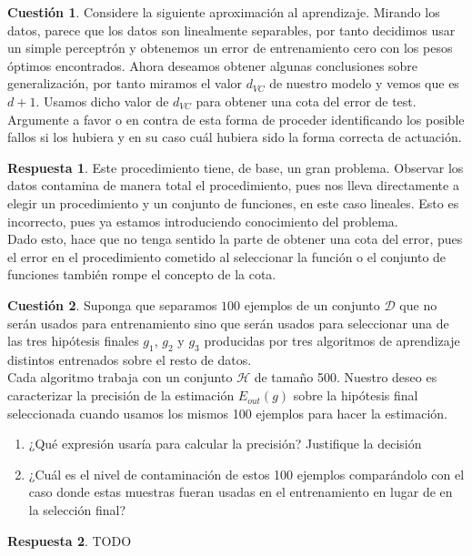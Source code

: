 \documentclass[10pt,a4paper]{article}
\theoremstyle{definition}
\newtheorem{cuestion}{Cuestión}
\newtheorem*{respuesta}{Respuesta}
\begin{document}
\begin{cuestion}
Considere la siguiente aproximación al aprendizaje. Mirando los datos, parece que los datos son linealmente separables, por tanto decidimos usar un simple perceptrón y obtenemos un error de entrenamiento cero con los pesos óptimos encontrados. Ahora deseamos obtener algunas conclusiones sobre generalización, por tanto miramos el valor $d_{VC}$ de nuestro modelo y vemos que es $d + 1$. Usamos dicho valor de $d_{VC}$ para obtener una cota del error de test. Argumente a favor o en contra de esta forma de proceder identificando los posible fallos si los hubiera y en su caso cuál hubiera sido la forma correcta de actuación.\\

\end{cuestion}
\begin{respuesta}
Este procedimiento tiene, de base, un gran problema. Observar los datos contamina de manera total el procedimiento, pues nos lleva directamente a elegir un procedimiento y un conjunto de funciones, en este caso lineales. Esto es incorrecto, pues ya estamos introduciendo conocimiento del problema.\\

Dado esto, hace que no tenga sentido la parte de obtener una cota del error, pues el error en el procedimiento cometido al seleccionar la función o el conjunto de funciones también rompe el concepto de la cota.\\
 
\end{respuesta}

\begin{cuestion}
Suponga que separamos $100$ ejemplos de un conjunto $\mathcal{D}$ que no serán usados para entrenamiento sino que serán usados para seleccionar una de las tres hipótesis finales $g_1$, $g_2$ y $g_3$ producidas por tres algoritmos de aprendizaje distintos entrenados sobre el resto de datos.\\
Cada algoritmo trabaja con un conjunto $\mathcal{H}$ de tamaño 500. Nuestro deseo es caracterizar la precisión de la estimación $E_{out}(g)$ sobre la hipótesis final seleccionada cuando usamos los mismos 100 ejemplos para hacer la estimación.
\begin{enumerate}[a]
\item ¿Qué expresión usaría para calcular la precisión? Justifique la decisión
\item ¿Cuál es el nivel de contaminación de estos 100 ejemplos comparándolo con el caso donde estas muestras fueran usadas en el entrenamiento en lugar de en la selección final?
\end{enumerate}
\end{cuestion}
\begin{respuesta}
TODO
\end{respuesta}
\end{document}
